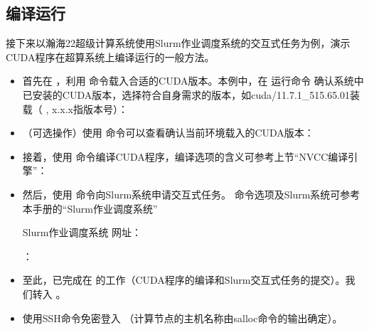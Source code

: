 \documentclass[a4paper,12pt,english]{sphinxmanual}
\begin{document}
\subsection{编译运行}
\label{\detokenize{gpu-computing/gpu-computing:id11}}
\sphinxAtStartPar
接下来以瀚海22超级计算系统使用Slurm作业调度系统的交互式任务为例，演示CUDA程序在超算系统上编译运行的一般方法。
\begin{itemize}
\item {} 
\sphinxAtStartPar
首先在  ，利用  命令载入合适的CUDA版本。本例中，在  运行命令  确认系统中已安装的CUDA版本，选择符合自身需求的版本，如cuda/11.7.1\_515.65.01装载（  , x.x.x指版本号）：

\end{itemize}

\noindent{}
\begin{itemize}
\item {} 
\sphinxAtStartPar
（可选操作）使用  命令可以查看确认当前环境载入的CUDA版本：

\end{itemize}

\noindent{}
\begin{itemize}
\item {} 
\sphinxAtStartPar
接着，使用  命令编译CUDA程序，编译选项的含义可参考上节“NVCC编译引擎”：

\end{itemize}

\noindent{}
\begin{itemize}
\item {} 
\sphinxAtStartPar
然后，使用  命令向Slurm系统申请交互式任务。  命令选项及Slurm系统可参考本手册的“Slurm作业调度系统” %
\begin{footnote}[4]\sphinxAtStartFootnote
Slurm作业调度系统
网址：
%
\end{footnote}：

\end{itemize}

\noindent{}
\begin{itemize}
\item {} 
\sphinxAtStartPar
至此，已完成在  的工作（CUDA程序的编译和Slurm交互式任务的提交）。我们转入  。

\item {} 
\sphinxAtStartPar
使用SSH命令免密登入  （计算节点的主机名称由salloc命令的输出确定）。

\end{itemize}
\end{document}
